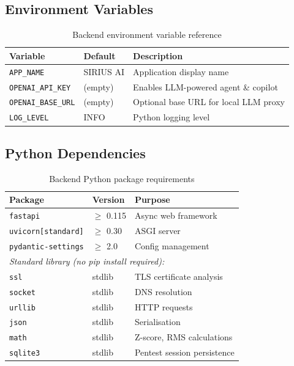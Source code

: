 \documentclass[12pt,a4paper]{article}
\begin{document}
\subsection{Environment Variables}

\begin{table}[H]
\centering
\caption{Backend environment variable reference}
\begin{tabular}{llp{6cm}}
\toprule
\textbf{Variable} & \textbf{Default} & \textbf{Description} \\
\midrule
\texttt{APP\_NAME}        & SIRIUS AI & Application display name \\
\texttt{OPENAI\_API\_KEY} & (empty)   & Enables LLM-powered agent \& copilot \\
\texttt{OPENAI\_BASE\_URL} & (empty)  & Optional base URL for local LLM proxy \\
\texttt{LOG\_LEVEL}       & INFO      & Python logging level \\
\bottomrule
\end{tabular}
\end{table}

\subsection{Python Dependencies}

\begin{table}[H]
\centering
\caption{Backend Python package requirements}
\begin{tabular}{lll}
\toprule
\textbf{Package} & \textbf{Version} & \textbf{Purpose} \\
\midrule
\texttt{fastapi}           & $\geq$ 0.115 & Async web framework \\
\texttt{uvicorn[standard]} & $\geq$ 0.30  & ASGI server \\
\texttt{pydantic-settings} & $\geq$ 2.0   & Config management \\
\midrule
\multicolumn{3}{l}{\textit{Standard library (no pip install required):}} \\
\texttt{ssl}    & stdlib & TLS certificate analysis \\
\texttt{socket} & stdlib & DNS resolution \\
\texttt{urllib} & stdlib & HTTP requests \\
\texttt{json}   & stdlib & Serialisation \\
\texttt{math}   & stdlib & Z-score, RMS calculations \\
\texttt{sqlite3} & stdlib & Pentest session persistence \\
\bottomrule
\end{tabular}
\end{table}
\end{document}
